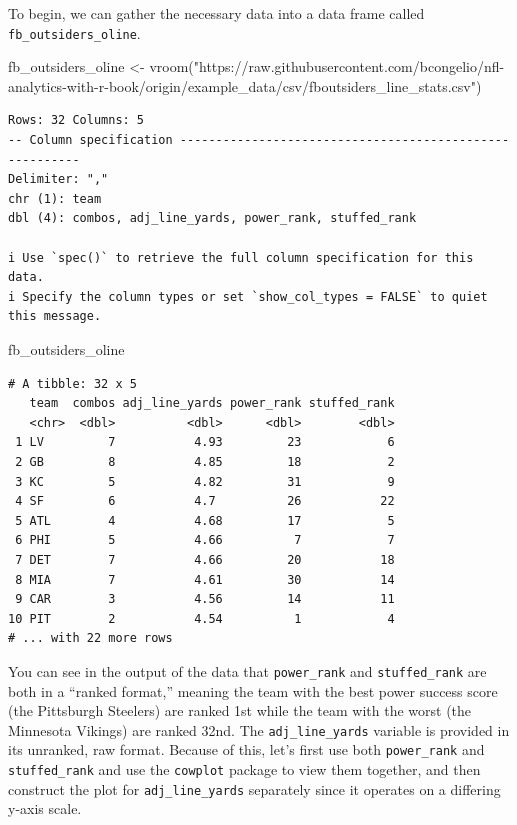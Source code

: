 \documentclass[
  letterpaper,
]{krantz}
\newenvironment{Shaded}{\begin{snugshade}}{\end{snugshade}}
\newcommand{\FunctionTok}[1]{\textcolor[rgb]{0.28,0.35,0.67}{#1}}
\newcommand{\NormalTok}[1]{\textcolor[rgb]{0.00,0.23,0.31}{#1}}
\newcommand{\OtherTok}[1]{\textcolor[rgb]{0.00,0.23,0.31}{#1}}
\newcommand{\StringTok}[1]{\textcolor[rgb]{0.13,0.47,0.30}{#1}}
\begin{document}
To begin, we can gather the necessary data into a data frame called
\texttt{fb\_outsiders\_oline}.

\begin{Shaded}
\begin{Highlighting}[]
\NormalTok{fb\_outsiders\_oline }\OtherTok{\textless{}{-}}
  \FunctionTok{vroom}\NormalTok{(}\StringTok{"https://raw.githubusercontent.com/bcongelio/nfl{-}analytics{-}with{-}r{-}book/origin/example\_data/csv/fboutsiders\_line\_stats.csv"}\NormalTok{)}
\end{Highlighting}
\end{Shaded}

\begin{verbatim}
Rows: 32 Columns: 5
-- Column specification --------------------------------------------------------
Delimiter: ","
chr (1): team
dbl (4): combos, adj_line_yards, power_rank, stuffed_rank

i Use `spec()` to retrieve the full column specification for this data.
i Specify the column types or set `show_col_types = FALSE` to quiet this message.
\end{verbatim}

\begin{Shaded}
\begin{Highlighting}[]
\NormalTok{fb\_outsiders\_oline}
\end{Highlighting}
\end{Shaded}

\begin{verbatim}
# A tibble: 32 x 5
   team  combos adj_line_yards power_rank stuffed_rank
   <chr>  <dbl>          <dbl>      <dbl>        <dbl>
 1 LV         7           4.93         23            6
 2 GB         8           4.85         18            2
 3 KC         5           4.82         31            9
 4 SF         6           4.7          26           22
 5 ATL        4           4.68         17            5
 6 PHI        5           4.66          7            7
 7 DET        7           4.66         20           18
 8 MIA        7           4.61         30           14
 9 CAR        3           4.56         14           11
10 PIT        2           4.54          1            4
# ... with 22 more rows
\end{verbatim}

You can see in the output of the data that \texttt{power\_rank} and
\texttt{stuffed\_rank} are both in a ``ranked format,'' meaning the team
with the best power success score (the Pittsburgh Steelers) are ranked
1st while the team with the worst (the Minnesota Vikings) are ranked
32nd. The \texttt{adj\_line\_yards} variable is provided in its
unranked, raw format. Because of this, let's first use both
\texttt{power\_rank} and \texttt{stuffed\_rank} and use the
\texttt{cowplot} package to view them together, and then construct the
plot for \texttt{adj\_line\_yards} separately since it operates on a
differing y-axis scale.
\end{document}
